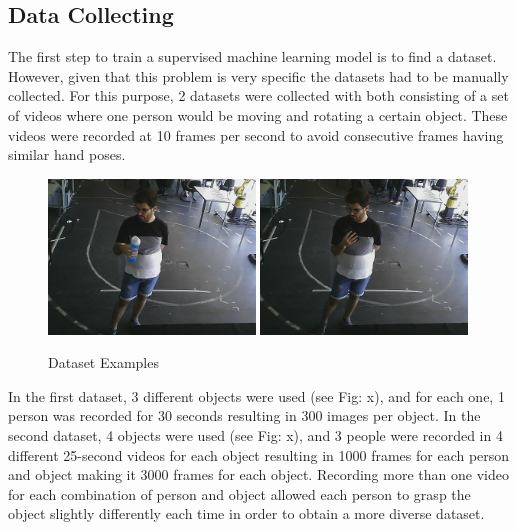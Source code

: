 \subsection{Data Collecting}

The first step to train a supervised machine learning model is to find a dataset. However, given that this problem is very specific the datasets had to be manually collected. For this purpose, 2 datasets were collected with both consisting of a set of videos where one person would be moving and rotating a certain object. These videos were recorded at 10 frames per second to avoid consecutive frames having similar hand poses.

\begin{figure}[H]
    \centerline{\includegraphics[width=0.49\textwidth]{figs/dataset_preprocessing1_1.png} \includegraphics[width=0.49\textwidth]{figs/dataset_preprocessing1_2.png}}
    \caption[Dataset Examples]{Dataset Examples}
    \label{fig:dataset_examples}
\end{figure}

In the first dataset, 3 different objects were used (see Fig: x), and for each one, 1 person was recorded for 30 seconds resulting in 300 images per object. In the second dataset, 4 objects were used (see Fig: x), and 3 people were recorded in 4 different 25-second videos for each object resulting in 1000 frames for each person and object making it 3000 frames for each object. Recording more than one video for each combination of person and object allowed each person to grasp the object slightly differently each time in order to obtain a more diverse dataset.

